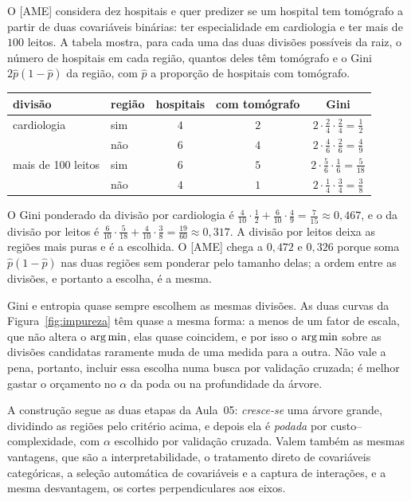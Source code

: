 \documentclass[11pt,a4paper]{article}
\begin{document}
\begin{exemplo}
O [AME] considera dez hospitais e quer predizer se um hospital tem tomógrafo a partir
de duas covariáveis binárias: ter especialidade em cardiologia e ter mais de $100$
leitos. A tabela mostra, para cada uma das duas divisões possíveis da raiz, o número
de hospitais em cada região, quantos deles têm tomógrafo e o Gini
$2\widehat p(1-\widehat p)$ da região, com $\widehat p$ a proporção de hospitais com
tomógrafo.
\begin{center}\small
\renewcommand{\arraystretch}{1.3}
\begin{tabular}{@{}llccc@{}}
\toprule
divisão & região & hospitais & com tomógrafo & Gini \\
\midrule
cardiologia        & sim & $4$ & $2$ & $2\cdot\frac24\cdot\frac24=\frac12$ \\
                   & não & $6$ & $4$ & $2\cdot\frac46\cdot\frac26=\frac49$ \\
mais de 100 leitos & sim & $6$ & $5$ & $2\cdot\frac56\cdot\frac16=\frac5{18}$ \\
                   & não & $4$ & $1$ & $2\cdot\frac14\cdot\frac34=\frac38$ \\
\bottomrule
\end{tabular}
\end{center}
O Gini ponderado da divisão por cardiologia é
$\frac4{10}\cdot\frac12+\frac6{10}\cdot\frac49=\frac7{15}\approx0{,}467$, e o da
divisão por leitos é
$\frac6{10}\cdot\frac5{18}+\frac4{10}\cdot\frac38=\frac{19}{60}\approx0{,}317$. A
divisão por leitos deixa as regiões mais puras e é a escolhida. O [AME] chega a
$0{,}472$ e $0{,}326$ porque soma $\widehat p(1-\widehat p)$ nas duas regiões sem
ponderar pelo tamanho delas; a ordem entre as divisões, e portanto a escolha, é a
mesma.
\end{exemplo}

\begin{observacao}
Gini e entropia quase sempre escolhem as mesmas divisões. As duas curvas da
Figura~\ref{fig:impureza} têm quase a mesma forma: a menos de um fator de escala, que
não altera o $\argmin$, elas quase coincidem, e por isso o $\argmin$ sobre as
divisões candidatas raramente muda de uma medida para a outra. Não vale a pena,
portanto, incluir essa escolha numa busca por validação cruzada; é melhor gastar o
orçamento no $\alpha$ da poda ou na profundidade da árvore.
\end{observacao}

\noindent A construção segue as duas etapas da Aula~05: \emph{cresce-se} uma árvore
grande, dividindo as regiões pelo critério acima, e depois ela é \emph{podada} por
custo--complexidade, com $\alpha$ escolhido por validação cruzada. Valem também as
mesmas vantagens, que são a interpretabilidade, o tratamento direto de covariáveis
categóricas, a seleção automática de covariáveis e a captura de interações, e a mesma
desvantagem, os cortes perpendiculares aos eixos.
\end{document}
